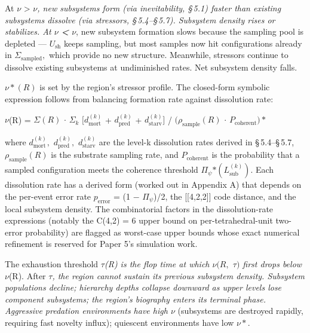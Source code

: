 \documentclass[11pt,oneside]{report}
\theoremstyle{definition}
\theoremstyle{remark}
\begin{document}
At \ensuremath{\nu} \textgreater{} \ensuremath{\nu}\emph{, new subsystems form (via inevitability,
\S\,5.1) faster than existing subsystems dissolve (via stressors,
\S\,5.4--\S\,5.7). Subsystem density rises or stabilizes. At \ensuremath{\nu}
\textbf{\textless{}} \ensuremath{\nu}}, new subsystem formation slows because the
sampling pool is depleted --- \ensuremath{U_{\mathrm{sh}}} keeps sampling, but most samples now
hit configurations already in \ensuremath{\Sigma_{\mathrm{sampled}},} which provide no new
structure. Meanwhile, stressors continue to dissolve existing subsystems
at undiminished rates. Net subsystem density falls.

\ensuremath{\nu *(R)} is set by the region's stressor profile. The closed-form symbolic
expression follows from balancing formation rate against dissolution
rate:

\emph{\ensuremath{\nu}}(R) = \textbar \ensuremath{\Sigma (R)}\textbar{} \ensuremath{\cdot} \ensuremath{\Sigma_{k}} \ensuremath{[d_{\mathrm{mort}}^{(k)}} +
\ensuremath{d_{\mathrm{pred}}^{(k)}} + \ensuremath{d_{\mathrm{starv}}^{(k)}]} / \ensuremath{(\rho_{\mathrm{sample}}(R)} \ensuremath{\cdot} \ensuremath{P_{\mathrm{coherent}})*}

where \ensuremath{d_{\mathrm{mort}}^{(k)},} \ensuremath{d_{\mathrm{pred}}^{(k)},} \ensuremath{d_{\mathrm{starv}}^{(k)}} are the level-k
dissolution rates derived in \S\,5.4--\S\,5.7, \ensuremath{\rho_{\mathrm{sample}}(R)} is the substrate
sampling rate, and \ensuremath{P_{\mathrm{coherent}}} is the probability that a sampled
configuration meets the coherence threshold
\textbar \ensuremath{\Pi_{\psi}}\textbar\ensuremath{*(L_{\mathrm{sub}}^{(k)}).} Each dissolution rate has a
derived form (worked out in Appendix A) that depends on the per-event
error rate \ensuremath{p_{\mathrm{error}}} = (1 \ensuremath{-} \textbar \ensuremath{\Pi_{\psi}}\textbar)/2, the
[[4,2,2]] code distance, and the local subsystem density. The
combinatorial factors in the dissolution-rate expressions (notably the
C(4,2) = 6 upper bound on per-tetrahedral-unit two-error probability)
are flagged as worst-case upper bounds whose exact numerical refinement
is reserved for Paper 5's simulation work.

The exhaustion threshold \ensuremath{\tau}\emph{(R) is the flop time at which \ensuremath{\nu (R,} \ensuremath{\tau )}
first drops below \ensuremath{\nu}}(R). After \ensuremath{\tau}\emph{, the region cannot sustain its
previous subsystem density. Subsystem populations decline; hierarchy
depths collapse downward as upper levels lose component subsystems; the
region's biography enters its terminal phase. Aggressive predation
environments have high \ensuremath{\nu}} (subsystems are destroyed rapidly, requiring
fast novelty influx); quiescent environments have low \ensuremath{\nu *.}
\end{document}
